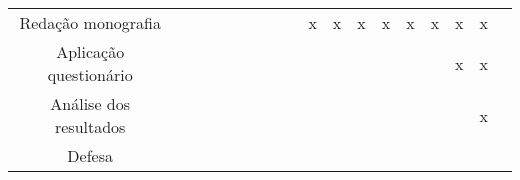 \begin{table}[h]
{\begin{tabular}{ l l l l l l l l l l l l l l l l l l }
    \multicolumn{1}{|c|}{Redação monografia} &
    \multicolumn{1}{c|}{ } &
    \multicolumn{1}{c|}{ } &
    \multicolumn{1}{c|}{ } &
    \multicolumn{1}{c|}{ } &
    \multicolumn{1}{c|}{ } &
    \multicolumn{1}{c|}{ } &
    \multicolumn{1}{c|}{ } &
    \multicolumn{1}{c|}{ } &
    \multicolumn{1}{c|}{x} &
    \multicolumn{1}{c|}{x} &
    \multicolumn{1}{c|}{x} &
    \multicolumn{1}{c|}{x} &
    \multicolumn{1}{c|}{x} &
    \multicolumn{1}{c|}{x} &
    \multicolumn{1}{c|}{x} &
    \multicolumn{1}{c|}{x} &
    \multicolumn{1}{c|}{ }
  \\  
  \cline{1-1}\cline{2-2}\cline{3-3}\cline{4-4}\cline{5-5}\cline{6-6}\cline{7-7}\cline{8-8}\cline{9-9}\cline{10-10}\cline{11-11}\cline{12-12}\cline{13-13}\cline{14-14}\cline{15-15}\cline{16-16}\cline{17-17}\cline{18-18}  
    \multicolumn{1}{|c|}{Aplicação questionário} &
    \multicolumn{1}{c|}{ } &
    \multicolumn{1}{c|}{ } &
    \multicolumn{1}{c|}{ } &
    \multicolumn{1}{c|}{ } &
    \multicolumn{1}{c|}{ } &
    \multicolumn{1}{c|}{ } &
    \multicolumn{1}{c|}{ } &
    \multicolumn{1}{c|}{ } &
    \multicolumn{1}{c|}{ } &
    \multicolumn{1}{c|}{ } &
    \multicolumn{1}{c|}{ } &
    \multicolumn{1}{c|}{ } &
    \multicolumn{1}{c|}{ } &
    \multicolumn{1}{c|}{ } &
    \multicolumn{1}{c|}{x} &
    \multicolumn{1}{c|}{x} &
    \multicolumn{1}{c|}{ }
  \\  
  \cline{1-1}\cline{2-2}\cline{3-3}\cline{4-4}\cline{5-5}\cline{6-6}\cline{7-7}\cline{8-8}\cline{9-9}\cline{10-10}\cline{11-11}\cline{12-12}\cline{13-13}\cline{14-14}\cline{15-15}\cline{16-16}\cline{17-17}\cline{18-18}  
    \multicolumn{1}{|c|}{Análise dos resultados} &
    \multicolumn{1}{c|}{ } &
    \multicolumn{1}{c|}{ } &
    \multicolumn{1}{c|}{ } &
    \multicolumn{1}{c|}{ } &
    \multicolumn{1}{c|}{ } &
    \multicolumn{1}{c|}{ } &
    \multicolumn{1}{c|}{ } &
    \multicolumn{1}{c|}{ } &
    \multicolumn{1}{c|}{ } &
    \multicolumn{1}{c|}{ } &
    \multicolumn{1}{c|}{ } &
    \multicolumn{1}{c|}{ } &
    \multicolumn{1}{c|}{ } &
    \multicolumn{1}{c|}{ } &
    \multicolumn{1}{c|}{ } &
    \multicolumn{1}{c|}{x} &
    \multicolumn{1}{c|}{ }
  \\  
  \cline{1-1}\cline{2-2}\cline{3-3}\cline{4-4}\cline{5-5}\cline{6-6}\cline{7-7}\cline{8-8}\cline{9-9}\cline{10-10}\cline{11-11}\cline{12-12}\cline{13-13}\cline{14-14}\cline{15-15}\cline{16-16}\cline{17-17}\cline{18-18}  
    \multicolumn{1}{|c|}{Defesa} &
    \multicolumn{1}{c|}{ } &
    \multicolumn{1}{c|}{ } &
    \multicolumn{1}{c|}{ } &
    \multicolumn{1}{c|}{ } &
    \multicolumn{1}{c|}{ } &

\end{tabular}}
\end{table}
